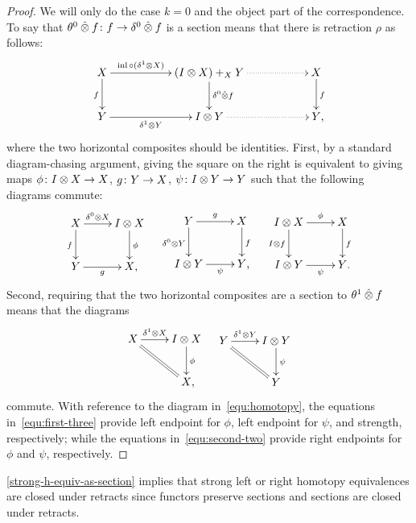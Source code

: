 \documentclass[reqno,10pt,a4paper,oneside,draft]{amsart}
\begin{document}
\begin{proof}
We will only do the case $k = 0$ and the object part of the correspondence.
To say that $\theta^0 \mathbin{\hat{\otimes}} f \colon f \to \delta^0 \mathbin{\hat{\otimes}} f$ is a section means that there is retraction $\rho$ as follows:
\[
\xymatrix@C+3em{
  X
  \ar[r]^-{\inl \cc (\rcyl \otimes X)}
  \ar[d]_f
&
  (\interval \otimes X) +_X Y
  \ar[d]^{\lcyl \hatotimes f}
  \ar@{.>}[r]
&
  X
  \ar[d]^f
\\
  Y
  \ar[r]_-{\rcyl \otimes Y}
&
  \interval \otimes Y
  \ar@{.>}[r]
&
  Y
\rlap{,}}
\]
where the two horizontal composites should be identities.
First, by a standard diagram-chasing argument, giving the square on the right is equivalent to giving maps $\phi \colon I \otimes X \to X$, $g \colon Y \to X$, $\psi \colon I \otimes Y \to Y$ such that the following diagrams commute:
\begin{align} \label{equ:first-three}
\xycenter{
  X
  \ar[r]^-{\lcyl \otimes X}
  \ar[d]_f
&
  \interval \otimes X
  \ar[d]^{\phi}
\\
  Y \ar[r]_-{g}
&
  X
\rlap{,}}
&&
\xycenter{
  Y
  \ar[r]^-g
  \ar[d]_{\lcyl \otimes Y}
&
  X
  \ar[d]^f
\\
  \interval \otimes Y
  \ar[r]_-{\psi}
&
  Y
\rlap{,}}
&&
\xycenter{
  \interval \otimes X
  \ar[r]^-\phi
  \ar[d]_{I \otimes f}
&
  X
  \ar[d]^{f}
\\
  \interval \otimes Y
  \ar[r]_-{\psi}
&
  Y
\rlap{.}}
\end{align}
Second, requiring that the two horizontal composites are a section to $\theta^1 \mathbin{\hat{\otimes}} f$ means that the diagrams
\begin{align} \label{equ:second-two}
\xycenter{
  X
  \ar[r]^-{\rcyl \otimes X}
  \ar@{=}[dr]
&
  \interval \otimes X
  \ar[d]^\phi
\\&
  X
\rlap{,}}
&&
\xycenter{
  Y
  \ar[r]^-{\rcyl \otimes Y}
  \ar@{=}[dr]
&
  \interval \otimes Y
  \ar[d]^{\psi}
\\&
  Y
}
\end{align}
commute.
With reference to the diagram in~\eqref{equ:homotopy}, the equations in~\eqref{equ:first-three} provide left endpoint for $\phi$, left endpoint for $\psi$, and strength, respectively; while the equations in~\eqref{equ:second-two} provide right endpoints for $\phi$ and $\psi$, respectively.
\end{proof}

\begin{remark}
\cref{strong-h-equiv-as-section} implies that strong left or right homotopy equivalences are closed under retracts since functors preserve sections and sections are closed under retracts.
\end{remark}
\end{document}

